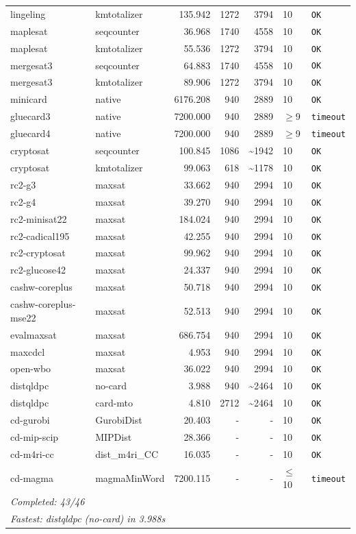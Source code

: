 \begin{longtable}{llrrrl p{}}
lingeling & kmtotalizer & 135.942 & 1272 & 3794 & 10 & \texttt{OK} \\
maplesat & seqcounter & 36.968 & 1740 & 4558 & 10 & \texttt{OK} \\
maplesat & kmtotalizer & 55.536 & 1272 & 3794 & 10 & \texttt{OK} \\
mergesat3 & seqcounter & 64.883 & 1740 & 4558 & 10 & \texttt{OK} \\
mergesat3 & kmtotalizer & 89.906 & 1272 & 3794 & 10 & \texttt{OK} \\
minicard & native & 6176.208 & 940 & 2889 & 10 & \texttt{OK} \\
gluecard3 & native & 7200.000 & 940 & 2889 & $\geq$9 & \texttt{timeout} \\
gluecard4 & native & 7200.000 & 940 & 2889 & $\geq$9 & \texttt{timeout} \\
cryptosat & seqcounter & 100.845 & 1086 & \textasciitilde{}1942 & 10 & \texttt{OK} \\
cryptosat & kmtotalizer & 99.063 & 618 & \textasciitilde{}1178 & 10 & \texttt{OK} \\
rc2-g3 & maxsat & 33.662 & 940 & 2994 & 10 & \texttt{OK} \\
rc2-g4 & maxsat & 39.270 & 940 & 2994 & 10 & \texttt{OK} \\
rc2-minisat22 & maxsat & 184.024 & 940 & 2994 & 10 & \texttt{OK} \\
rc2-cadical195 & maxsat & 42.255 & 940 & 2994 & 10 & \texttt{OK} \\
rc2-cryptosat & maxsat & 99.962 & 940 & 2994 & 10 & \texttt{OK} \\
rc2-glucose42 & maxsat & 24.337 & 940 & 2994 & 10 & \texttt{OK} \\
cashw-coreplus & maxsat & 50.718 & 940 & 2994 & 10 & \texttt{OK} \\
cashw-coreplus-mse22 & maxsat & 52.513 & 940 & 2994 & 10 & \texttt{OK} \\
evalmaxsat & maxsat & 686.754 & 940 & 2994 & 10 & \texttt{OK} \\
maxcdcl & maxsat & 4.953 & 940 & 2994 & 10 & \texttt{OK} \\
open-wbo & maxsat & 36.022 & 940 & 2994 & 10 & \texttt{OK} \\
distqldpc & no-card & 3.988 & 940 & \textasciitilde{}2464 & 10 & \texttt{OK} \\
distqldpc & card-mto & 4.810 & 2712 & \textasciitilde{}2464 & 10 & \texttt{OK} \\
cd-gurobi & GurobiDist & 20.403 & - & - & 10 & \texttt{OK} \\
cd-mip-scip & MIPDist & 28.366 & - & - & 10 & \texttt{OK} \\
cd-m4ri-cc & dist\_m4ri\_CC & 16.035 & - & - & 10 & \texttt{OK} \\
cd-magma & magmaMinWord & 7200.115 & - & - & $\leq$10 & \texttt{timeout} \\
\midrule
\multicolumn{7}{l}{\textit{Completed: 43/46}} \\
\multicolumn{7}{l}{\textit{Fastest: distqldpc (no-card) in 3.988s}} \\
\end{longtable}
